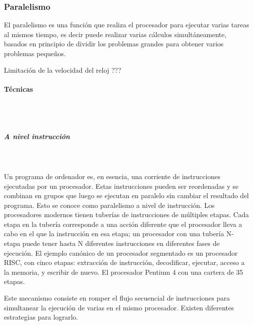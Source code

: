 \subsubsection{Paralelismo}
El paralelismo es una función que realiza el procesador para ejecutar varias tareas al mismos tiempo, es decir puede realizar varias cálculos simultáneamente, basados en principio de dividir los problemas grandes para obtener varios problemas pequeños.

Limitación de la velocidad del reloj ???

\paragraph{Técnicas}\mbox{}\\\\%
\subparagraph{A nivel instrucción}\mbox{}\\\\%
Un programa de ordenador es, en esencia, una corriente de instrucciones ejecutadas por un procesador. Estas instrucciones pueden ser reordenadas y se combinan en grupos que luego se ejecutan en paralelo sin cambiar el resultado del programa. Esto se conoce como paralelismo a nivel de instrucción. 
Los procesadores modernos tienen tuberías de instrucciones de múltiples etapas. Cada etapa en la tubería corresponde a una acción diferente que el procesador lleva a cabo en el que la instrucción en esa etapa; un procesador con una tubería N-etapa puede tener hasta N diferentes instrucciones en diferentes fases de ejecución. El ejemplo canónico de un procesador segmentado es un procesador RISC, con cinco etapas: extracción de instrucción, decodificar, ejecutar, acceso a la memoria, y escribir de nuevo. El procesador Pentium 4 con una cartera de 35 etapas.

Este mecanismo consiste en romper el flujo secuencial de instrucciones para simultanear la ejecución de varias en el mismo procesador. Existen diferentes estrategias para lograrlo.

